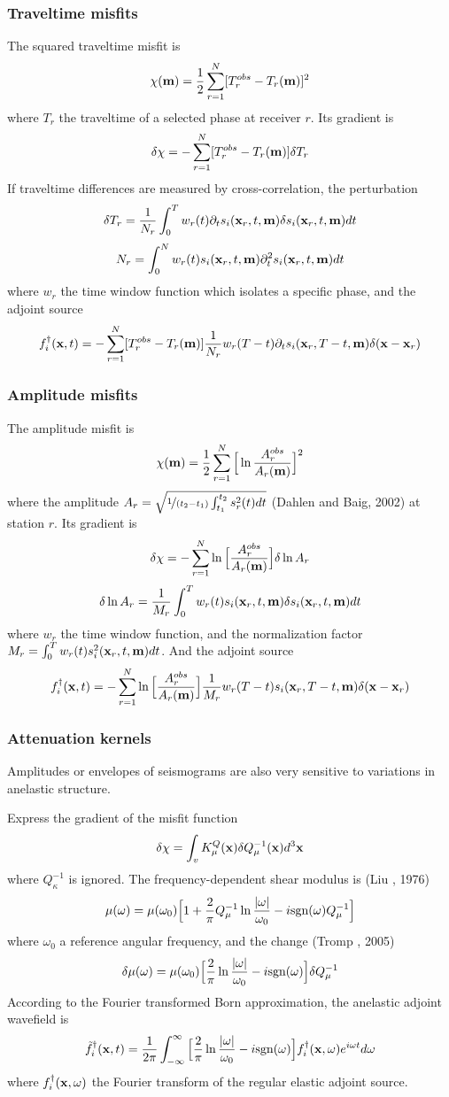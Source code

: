 \subsubsection{Traveltime misfits}
The squared traveltime misfit is
\[ \chi(\mathbf{m})=\frac{1}{2}\sum_{r=1}^N[T_r^{obs}-T_r(\mathbf{m})]^2 \]
where $T_r$ the traveltime of a selected phase at receiver $r$.
Its gradient is
\[ \delta\chi=-\sum_{r=1}^N[T_r^{obs}-T_r(\mathbf{m})]\delta T_r \]
If traveltime differences are measured by cross-correlation, the perturbation
\[ \delta T_r=\frac{1}{N_r}\int_0^Tw_r(t)\partial_ts_i(\mathbf{x}_r,t,\mathbf{m})\delta s_i(\mathbf{x}_r,t,\mathbf{m})dt \]
\[ N_r=\int_0^Nw_r(t)s_i(\mathbf{x}_r,t,\mathbf{m})\partial_t^2s_i(\mathbf{x}_r,t,\mathbf{m})dt \]
where $w_r$ the time window function which isolates a specific phase, and the adjoint source
\[ f_i^\dagger(\mathbf{x},t)=-\sum_{r=1}^N[T_r^{obs}-T_r(\mathbf{m})]\frac{1}{N_r}w_r(T-t)\partial_ts_i(\mathbf{x}_r,T-t,\mathbf{m})\delta(\mathbf{x}-\mathbf{x}_r) \]

\subsubsection{Amplitude misfits}
The amplitude misfit is
\[ \chi(\mathbf{m})=\frac{1}{2}\sum_{r=1}^N\Big[\ln\frac{A_r^{obs}}{A_r(\mathbf{m})}\Big]^2 \]
where the amplitude $A_r=\sqrt{\nicefrac{1}{(t_2-t_1)}\int_{t_1}^{t_2}s_r^2(t)dt}$
(Dahlen and Baig, 2002) at station $r$.
Its gradient is
\[ \delta\chi=-\sum_{r=1}^N\ln\Big[\frac{A_r^{obs}}{A_r(\mathbf{m})}\Big]\delta\ln A_r \]
\[ \delta\ln A_r=\frac{1}{M_r}\int_0^Tw_r(t)s_i(\mathbf{x}_r,t,\mathbf{m})\delta s_i(\mathbf{x}_r,t,\mathbf{m})dt \]
where $w_r$ the time window function,
and the normalization factor $M_r=\int_0^Tw_r(t)s_i^2(\mathbf{x}_r,t,\mathbf{m})dt$.
And the adjoint source
\[ f_i^\dagger(\mathbf{x},t)=-\sum_{r=1}^N\ln\Big[\frac{A_r^{obs}}{A_r(\mathbf{m})}\Big]\frac{1}{M_r}w_r(T-t)s_i(\mathbf{x}_r,T-t,\mathbf{m})\delta(\mathbf{x}-\mathbf{x}_r) \]

\subsubsection{Attenuation kernels}
Amplitudes or envelopes of seismograms are also very sensitive to variations in anelastic structure.

Express the gradient of the misfit function
\[ \delta\chi=\int_vK_\mu^Q(\mathbf{x})\delta Q_\mu^{-1}(\mathbf{x})d^3\mathbf{x} \]
where $Q_\kappa^{-1}$ is ignored. The frequency-dependent shear modulus is (Liu \etal, 1976)
\[ \mu(\omega)=\mu(\omega_0)\Big[1+\frac{2}{\pi}Q_\mu^{-1}\ln\frac{|\omega|}{\omega_0}-i\text{sgn}(\omega)Q_\mu^{-1}\Big] \]
where $\omega_0$ a reference angular frequency, and the change (Tromp \etal, 2005)
\[ \delta\mu(\omega)=\mu(\omega_0)\Big[\frac{2}{\pi}\ln\frac{|\omega|}{\omega_0}-i\text{sgn}(\omega)\Big]\delta Q_\mu^{-1} \]
According to the Fourier transformed Born approximation, the anelastic adjoint wavefield is
\[ \tilde f_i^\dagger(\mathbf{x},t)=\frac{1}{2\pi}\int_{-\infty}^\infty\Big[\frac{2}{\pi}\ln\frac{|\omega|}{\omega_0}-i\text{sgn}(\omega)\Big]f_i^\dagger(\mathbf{x},\omega)e^{i\omega t}d\omega \]
where $f_i^\dagger(\mathbf{x},\omega)$ the Fourier transform of the regular elastic adjoint source.

